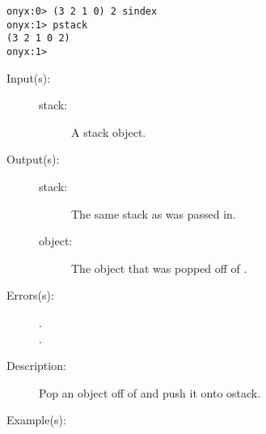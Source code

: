 \begin{description}
\begin{description}
\begin{verbatim}
onyx:0> (3 2 1 0) 2 sindex
onyx:1> pstack
(3 2 1 0 2)
onyx:1>
		\end{verbatim}
	\end{description}
\label{systemdict:spop}
\item[{\onyxop{stack}{spop}{stack object}}: ]
	\begin{description}\item[]
	\item[Input(s): ]
		\begin{description}\item[]
		\item[stack: ]
			A stack object.
		\end{description}
	\item[Output(s): ]
		\begin{description}\item[]
		\item[stack: ]
			The same stack as was passed in.
		\item[object: ]
			The object that was popped off of .
		\end{description}
	\item[Errors(s): ]
		\begin{description}\item[]
		\item[.]
		\item[.]
		\end{description}
	\item[Description: ]
		Pop an object off of  and push it onto ostack.
	\item[Example(s): ]\begin{verbatim}


\end{verbatim}
\end{description}
\end{description}
